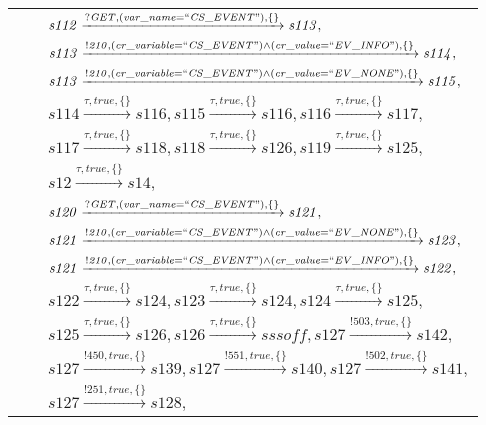 \begin{tabular}{lcl}
& & $\mathit{s112}\xrightarrow{\mathit{?GET}, \mathit{(var\_name = ``CS\_EVENT")}, \{\}}\mathit{s113},$ \\
& & $\mathit{s113}\xrightarrow{\mathit{!210}, \mathit{(cr\_variable = ``CS\_EVENT") \land (cr\_value = ``EV\_INFO")}, \{\}}\mathit{s114},$ \\
& & $\mathit{s113}\xrightarrow{\mathit{!210}, \mathit{(cr\_variable = ``CS\_EVENT") \land (cr\_value = ``EV\_NONE")}, \{\}}\mathit{s115},$ \\
& & $\mathit{s114}\xrightarrow{\mathit{\tau}, \mathit{true}, \{\}}\mathit{s116},\mathit{s115}\xrightarrow{\mathit{\tau}, \mathit{true}, \{\}}\mathit{s116},\mathit{s116}\xrightarrow{\mathit{\tau}, \mathit{true}, \{\}}\mathit{s117},$ \\
& & $\mathit{s117}\xrightarrow{\mathit{\tau}, \mathit{true}, \{\}}\mathit{s118},\mathit{s118}\xrightarrow{\mathit{\tau}, \mathit{true}, \{\}}\mathit{s126},\mathit{s119}\xrightarrow{\mathit{\tau}, \mathit{true}, \{\}}\mathit{s125},$ \\
& & $\mathit{s12}\xrightarrow{\mathit{\tau}, \mathit{true}, \{\}}\mathit{s14},$ \\
& & $\mathit{s120}\xrightarrow{\mathit{?GET}, \mathit{(var\_name = ``CS\_EVENT")}, \{\}}\mathit{s121},$ \\
& & $\mathit{s121}\xrightarrow{\mathit{!210}, \mathit{(cr\_variable = ``CS\_EVENT") \land (cr\_value = ``EV\_NONE")}, \{\}}\mathit{s123},$ \\
& & $\mathit{s121}\xrightarrow{\mathit{!210}, \mathit{(cr\_variable = ``CS\_EVENT") \land (cr\_value = ``EV\_INFO")}, \{\}}\mathit{s122},$ \\
& & $\mathit{s122}\xrightarrow{\mathit{\tau}, \mathit{true}, \{\}}\mathit{s124},\mathit{s123}\xrightarrow{\mathit{\tau}, \mathit{true}, \{\}}\mathit{s124},\mathit{s124}\xrightarrow{\mathit{\tau}, \mathit{true}, \{\}}\mathit{s125},$ \\
& & $\mathit{s125}\xrightarrow{\mathit{\tau}, \mathit{true}, \{\}}\mathit{s126},\mathit{s126}\xrightarrow{\mathit{\tau}, \mathit{true}, \{\}}\mathit{sssoff},\mathit{s127}\xrightarrow{\mathit{!503}, \mathit{true}, \{\}}\mathit{s142},$ \\
& & $\mathit{s127}\xrightarrow{\mathit{!450}, \mathit{true}, \{\}}\mathit{s139},\mathit{s127}\xrightarrow{\mathit{!551}, \mathit{true}, \{\}}\mathit{s140},\mathit{s127}\xrightarrow{\mathit{!502}, \mathit{true}, \{\}}\mathit{s141},$ \\
& & $\mathit{s127}\xrightarrow{\mathit{!251}, \mathit{true}, \{\}}\mathit{s128},$ \\

\end{tabular}
